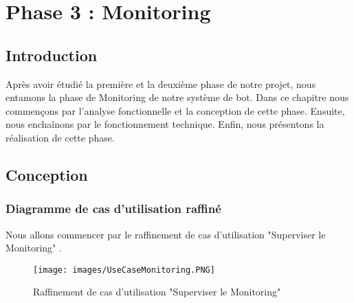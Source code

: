 \chapter{Phase 3 : Monitoring}

\section*{Introduction}
Après avoir étudié la première et la deuxième phase de notre projet, nous entamons la phase de Monitoring de notre système de bot. Dans ce chapitre nous commençons par l’analyse fonctionnelle et la conception de cette phase. Ensuite, nous enchaînons par le fonctionnement technique. Enfin, nous présentons la réalisation de cette phase.

\section{Conception}
\subsection{Diagramme de cas d’utilisation raffiné}
\noinden Nous allons commencer par le raffinement de cas d'utilisation "Superviser le Monitoring" .
\begin{figure}[H]
            \centering
            \texttt{[image: images/UseCaseMonitoring.PNG]}
            \caption{Raffinement de cas d'utilisation "Superviser le Monitoring"}
            \label{fig:UseCase}  
        \end{figure}
